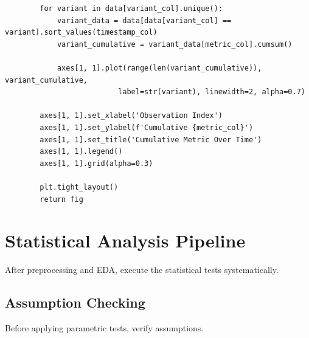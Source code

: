 \begin{lstlisting}
        for variant in data[variant_col].unique():
            variant_data = data[data[variant_col] == variant].sort_values(timestamp_col)
            variant_cumulative = variant_data[metric_col].cumsum()

            axes[1, 1].plot(range(len(variant_cumulative)), variant_cumulative,
                          label=str(variant), linewidth=2, alpha=0.7)

        axes[1, 1].set_xlabel('Observation Index')
        axes[1, 1].set_ylabel(f'Cumulative {metric_col}')
        axes[1, 1].set_title('Cumulative Metric Over Time')
        axes[1, 1].legend()
        axes[1, 1].grid(alpha=0.3)

        plt.tight_layout()
        return fig

\end{lstlisting}

\section{Statistical Analysis Pipeline}

After preprocessing and EDA, execute the statistical tests systematically.

\subsection{Assumption Checking}

Before applying parametric tests, verify assumptions.

